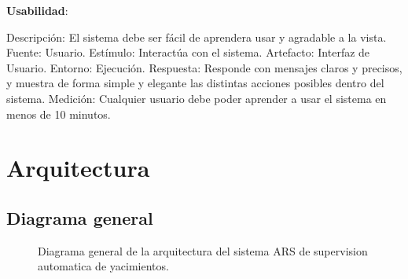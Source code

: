 \documentclass{article}
\theoremstyle{definition}
\theoremstyle{remark}
\begin{document}
\textbf{Usabilidad}:

Descripción: El sistema debe ser fácil de aprendera usar y agradable a la vista.
Fuente: Usuario.
Estímulo: Interactúa con el sistema.
Artefacto: Interfaz de Usuario.
Entorno: Ejecución.
Respuesta: Responde con mensajes claros y precisos, y muestra de forma simple y elegante las distintas acciones posibles dentro del sistema.
Medición: Cualquier usuario debe poder aprender a usar el sistema en menos de 10 minutos.



\pagebreak

\section{Arquitectura}

\subsection{Diagrama general}

\begin{figure}[H]
	\caption{Diagrama general de la arquitectura del sistema ARS de supervision automatica de yacimientos.}
\end{figure}
\end{document}
